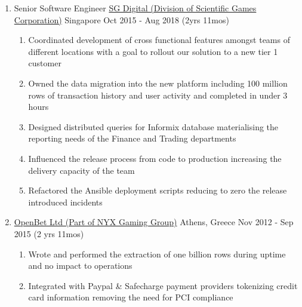 \documentclass{CVSoftwareEngineer}
\begin{document}
\begin{enumerate}[labelwidth=!, labelindent=0pt, leftmargin=*, rightmargin=15pt]
		\item[] \cvExperience
			{Senior Software Engineer}
			{\href{https://www.sgdigital.com/}{SG Digital (Division of Scientific Games Corporation)}}
			{Singapore}
			{Oct 2015 - Aug 2018 (2yrs 11mos)}
			{
				\begin{enumerate}[labelwidth=!, labelindent=0pt, nosep, leftmargin=*]
					\item[\textasteriskcentered] Coordinated development of cross functional features
						amongst teams of different locations with a goal to rollout
						our solution to a new tier 1 customer
					\item[\textasteriskcentered] Owned the data migration into the new
						platform including 100 million rows of transaction history and
						user activity and completed in under 3 hours
					\item[\textasteriskcentered] Designed distributed queries for Informix database
						materialising the reporting needs of the Finance and Trading departments
					\item[\textasteriskcentered] Influenced the release process from code to
						production increasing the delivery capacity of the team
					\item[\textasteriskcentered] Refactored the Ansible deployment scripts
						reducing to zero the release introduced incidents
				\end{enumerate}
			}

		\item[]  
			{\href{http://www.openbet.com}{OpenBet Ltd (Part of NYX Gaming Group)}}
			{Athens, Greece}
			{Nov 2012 - Sep 2015 (2 yrs 11mos)}
			{
				\begin{enumerate}[labelwidth=!, labelindent=0pt, nosep, leftmargin=*]
					\item[\textasteriskcentered] Wrote and performed the extraction of
						one billion rows during uptime and no impact to operations
					\item[\textasteriskcentered] Integrated with Paypal \& Safecharge
						payment providers tokenizing credit card information removing
						the need for PCI compliance
				\end{enumerate}
			}
	\end{enumerate}
\end{document}
